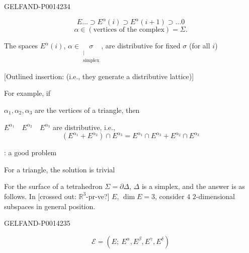 \begin{GelfandAdjacentEvidence}{GELFAND-P001423}{4}

\[
E\ldots\supset E^\alpha(i)\supset E^\alpha(i+1)\supset\ldots 0
\]
\[
\alpha\in(\text{vertices of the complex})=\Sigma.
\]

The spaces \(E^\alpha(i)\), \(\alpha\in\underset{\substack{|\\\text{simplex}}}{\sigma}\),
are distributive for fixed \(\sigma\) (for all \(i\))

[Outlined insertion: (i.e., they generate a distributive lattice)]

For example, if

\(\alpha_1,\alpha_2,\alpha_3\) are the vertices of a triangle, then

\(E^{\alpha_1}\quad E^{\alpha_2}\quad E^{\alpha_3}\) are distributive, i.e.,
\[
(E^{\alpha_1}+E^{\alpha_2})\cap E^{\alpha_3}
=E^{\alpha_1}\cap E^{\alpha_3}+E^{\alpha_2}\cap E^{\alpha_3}
\]

: a good problem

For a triangle, the solution is trivial

For the surface of a tetrahedron \(\Sigma=\partial\Delta\), \(\Delta\) is a simplex, and the answer is as follows. In
[crossed out: \(\mathbb R^3\)-pr-ve?] \(E\), \(\dim E=3\), consider \(4\) \(2\)-dimensional subspaces in general position.
\end{GelfandAdjacentEvidence}
\begin{GelfandAdjacentEvidence}{GELFAND-P001423}{5}

\[
\mathcal E=(E;\ E^\alpha,E^\beta,E^\gamma,E^\delta)
\]
\end{GelfandAdjacentEvidence}



